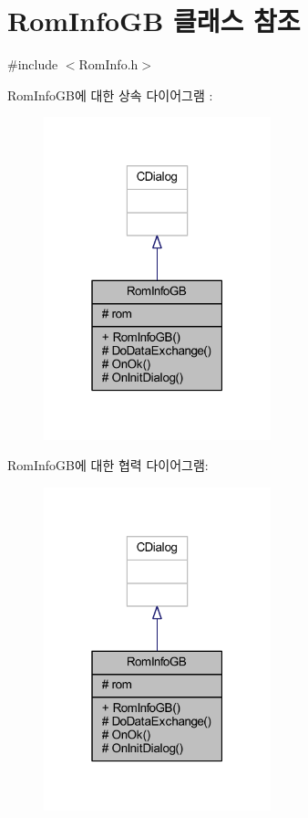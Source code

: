 \hypertarget{class_rom_info_g_b}{}\section{Rom\+Info\+GB 클래스 참조}
\label{class_rom_info_g_b}


{\ttfamily \#include $<$Rom\+Info.\+h$>$}



Rom\+Info\+G\+B에 대한 상속 다이어그램 \+: \nopagebreak
\begin{figure}[H]
\begin{center}
\leavevmode
\includegraphics[width=187pt]{class_rom_info_g_b__inherit__graph}
\end{center}
\end{figure}


Rom\+Info\+G\+B에 대한 협력 다이어그램\+:\nopagebreak
\begin{figure}[H]
\begin{center}
\leavevmode
\includegraphics[width=187pt]{class_rom_info_g_b__coll__graph}
\end{center}
\end{figure}

